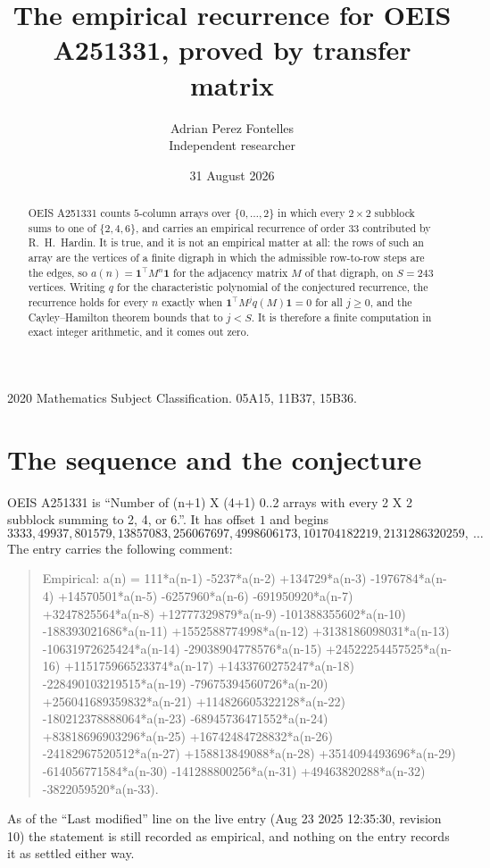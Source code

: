 \documentclass[11pt,a4paper]{article}
\title{The empirical recurrence for OEIS A251331, proved by transfer matrix}
\author{Adrian Perez Fontelles\\ \small Independent researcher}
\date{31 August 2026}
\theoremstyle{plain}
\theoremstyle{definition}
\begin{document}
\maketitle

\begin{abstract}
OEIS A251331 counts $5$-column arrays over $\{0,\dots,2\}$ in which every
$2\times2$ subblock sums to one of $\{2, 4, 6\}$, and carries an empirical
recurrence of order $33$ contributed by R.~H.~Hardin. It is true, and it is not an
empirical matter at all: the rows of such an array are the vertices of a finite digraph in
which the admissible row-to-row steps are the edges, so $a(n)=\mathbf{1}^{\!\top}M^{n}
\mathbf{1}$ for the adjacency matrix $M$ of that digraph, on $S=243$ vertices. Writing
$q$ for the characteristic polynomial of the conjectured recurrence, the recurrence holds
for every $n$ exactly when $\mathbf{1}^{\!\top}M^{j}q(M)\mathbf{1}=0$ for all
$j\ge0$, and the Cayley--Hamilton theorem bounds that to $j<S$. It is therefore a finite
computation in exact integer arithmetic, and it comes out zero.
\end{abstract}

\noindent\small 2020 Mathematics Subject Classification. 05A15, 11B37, 15B36.\normalsize

\section{The sequence and the conjecture}

OEIS A251331 is ``Number of (n+1) X (4+1) 0..2 arrays with every 2 X 2 subblock summing to 2, 4, or 6.''. It has offset $1$
and begins
\[
3333, 49937, 801579, 13857083, 256067697, 4998606173, 101704182219, 2131286320259,\ \dots
\]
The entry carries the following comment:
\begin{quote}\small
Empirical: a(n) = 111*a(n-1) -5237*a(n-2) +134729*a(n-3) -1976784*a(n-4) +14570501*a(n-5) -6257960*a(n-6) -691950920*a(n-7) +3247825564*a(n-8) +12777329879*a(n-9) -101388355602*a(n-10) -188393021686*a(n-11) +1552588774998*a(n-12) +3138186098031*a(n-13) -10631972625424*a(n-14) -29038904778576*a(n-15) +24522254457525*a(n-16) +115175966523374*a(n-17) +1433760275247*a(n-18) -228490103219515*a(n-19) -79675394560726*a(n-20) +256041689359832*a(n-21) +114826605322128*a(n-22) -180212378888064*a(n-23) -68945736471552*a(n-24) +83818696903296*a(n-25) +16742484728832*a(n-26) -24182967520512*a(n-27) +158813849088*a(n-28) +3514094493696*a(n-29) -614056771584*a(n-30) -141288800256*a(n-31) +49463820288*a(n-32) -3822059520*a(n-33).
\end{quote}
As of the ``Last modified'' line on the live entry (Aug 23 2025 12:35:30, revision 10) the statement is
still recorded as empirical, and nothing on the entry records it as settled either way.
\end{document}
